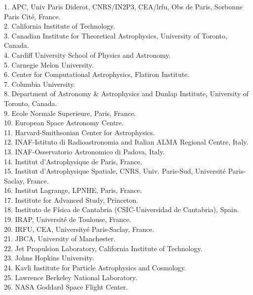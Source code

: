 \documentclass[PICOReport.tex]{subfiles}
\begin{document}
\begin{multicols}{2}
\raggedright 
\scriptsize {
1. APC, Univ Paris Diderot, CNRS/IN2P3, CEA/lrfu, Obs de Paris, Sorbonne Paris Cité, France.  \\
2. California Institute of Technology.  \\
3. Canadian Institute for Theoretical Astrophysics, University of Toronto, Canada.  \\
4. Cardiff University School of Physics and Astronomy.  \\
5. Carnegie Melon University.  \\
6. Center for Computational Astrophysics, Flatiron Institute.  \\
7. Columbia University.  \\
8. Department of Astronomy \& Astrophysics and Dunlap Institute, University of Toronto, Canada.  \\
9. Ecole Normale Superieure, Paris, France.  \\
10. European Space Astronomy Centre.  \\
11. Harvard-Smithsonian Center for Astrophysics.  \\
12. INAF-Istituto di Radioastronomia and Italian ALMA Regional Centre, Italy.  \\
13. INAF-Osservatorio Astronomico di Padova, Italy.  \\
14. Institut d'Astrophysique de Paris, France.  \\
15. Institut d'Astrophysique Spatiale, CNRS, Univ. Paris-Sud, Universit\'e Paris-Saclay, France.  \\
16. Institut Lagrange, LPNHE,  Paris, France.  \\
17. Institute for Advanced Study, Princeton.  \\
18. Instituto de F\'isica de Cantabria (CSIC-Universidad de Cantabria), Spain.  \\
19. IRAP, Universit\'e de Toulouse, France.  \\
20. IRFU, CEA, University\'e Paris-Saclay, France.  \\
21. JBCA, University of Manchester.  \\
22. Jet Propulsion Laboratory, California Institute of Technology.  \\
23. Johns Hopkins University.  \\
24. Kavli Institute for Particle Astrophysics and Cosmology.  \\
25. Lawrence Berkeley National Laboratory.  \\
26. NASA Goddard Space Flight Center.  \\
}
\end{multicols}
\end{document}
